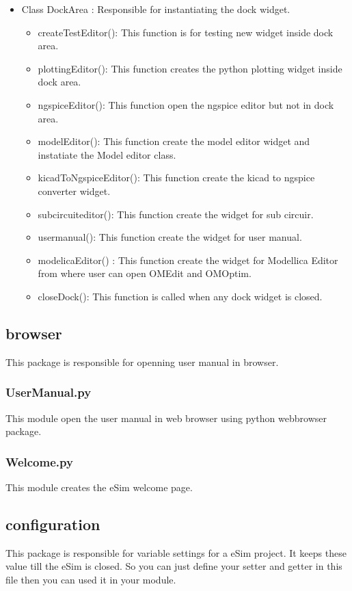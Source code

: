 \documentclass[12pt]{article}
\begin{document}
\begin{itemize}
	\item Class DockArea : Responsible for instantiating the dock widget.
	\begin{itemize}
		\item createTestEditor(): This function is for testing new widget inside dock area.
		\item plottingEditor(): This function creates the python plotting widget inside dock area.
		\item ngspiceEditor(): This function open the ngspice editor but not in dock area.
		\item modelEditor(): This function create the model editor widget and instatiate the Model editor class.
		\item kicadToNgspiceEditor(): This function create the kicad to ngspice converter widget.
		\item subcircuiteditor(): This function create the widget for sub circuir.
		\item usermanual(): This function create the widget for user manual.
		\item modelicaEditor() : This function create the widget for Modellica Editor from where user can open OMEdit and OMOptim.
		\item closeDock(): This function is called when any dock widget is closed.
		
	\end{itemize}

\end{itemize}
\newpage

\subsection{browser}
This package is responsible for openning user manual in browser.

\subsubsection{UserManual.py}
This module open the user manual in web browser using python webbrowser package.

\subsubsection{Welcome.py}
This module creates the eSim welcome page.

\subsection{configuration}
This package is responsible for variable settings for a eSim project. It keeps these value till the eSim is closed. So you can just define your setter and getter in this file then you can used it in your module.
\end{document}
